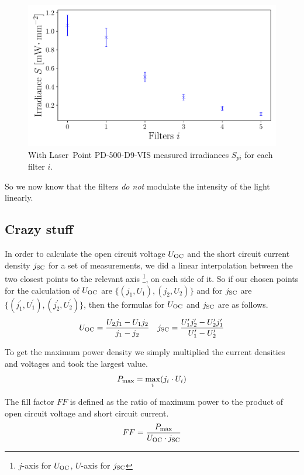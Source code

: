 \begin{figure}[h]
\includegraphics[scale=0.5]{../2_Pictures/Photodiode_irradiance.pdf}
\caption{With Laser~Point PD-500-D9-VIS measured irradiances $S_{pi}$ for each filter $i$.}
\label{fig:photodiode_irradiances}
\end{figure}

So we now know that the filters \emph{do not} modulate the intensity of the light linearly.

\subsection{Crazy stuff}


In order to calculate the open circuit voltage $U_{\text{OC}}$ and the short circuit current density $j_{\text{SC}}$ for a set of measurements, we did a linear interpolation between the two closest points to the relevant axis \footnote{$j$-axis for $U_{\text{OC}}$, $U$-axis for $j_{\text{SC}}$}, on each side of it. So if our chosen points for the calculation of $U_{\text{OC}}$ are $\{(j_1,U_1),(j_2,U_2)\}$ and for $j_{\text{SC}}$ are $\{(j_1^\prime,U_1^\prime),(j_2^\prime,U_2^\prime)\}$, then the formulas for $U_{\text{OC}}$ and $j_{\text{SC}}$ are as follows.
\begin{align}
U_{\text{OC}} = \frac{U_2 j_1 - U_1 j_2}{j_1-j_2}\quad j_{\text{SC}} = \frac{U_1^\prime j_2^\prime - U_2^\prime j_1^\prime}{U_1^\prime-U_2^\prime}
\end{align}

To get the maximum power density we simply multiplied the current densities and voltages and took the largest value.
\begin{align}
P_{\text{max}} = \max_{i} (j_i\cdot U_i)
\end{align}

The fill factor $FF$ is defined as the ratio of maximum power to the product of open circuit voltage and short circuit current.
\begin{align}
FF = \frac{P_{\text{max}}}{U_{\text{OC}} \cdot j_{\text{SC}}}
\end{align}

